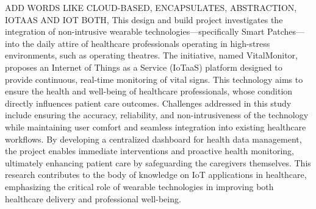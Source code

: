 ADD WORDS LIKE CLOUD-BASED, ENCAPSULATES, ABSTRACTION, IOTAAS AND IOT BOTH, 
This design and build project investigates the integration of non-intrusive wearable technologies—specifically Smart Patches—into the daily attire of healthcare professionals operating in high-stress environments, such as operating theatres. The initiative, named VitalMonitor, proposes an Internet of Things as a Service (IoTaaS) platform designed to provide continuous, real-time monitoring of vital signs. This technology aims to ensure the health and well-being of healthcare professionals, whose condition directly influences patient care outcomes. Challenges addressed in this study include ensuring the accuracy, reliability, and non-intrusiveness of the technology while maintaining user comfort and seamless integration into existing healthcare workflows. By developing a centralized dashboard for health data management, the project enables immediate interventions and proactive health monitoring, ultimately enhancing patient care by safeguarding the caregivers themselves. This research contributes to the body of knowledge on IoT applications in healthcare, emphasizing the critical role of wearable technologies in improving both healthcare delivery and professional well-being.


